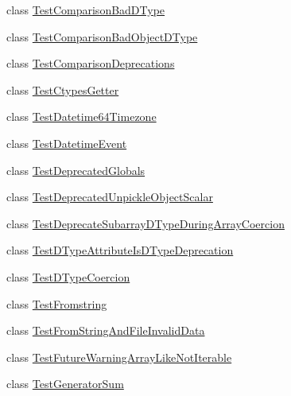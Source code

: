 \begin{DoxyCompactItemize}
class \hyperlink{classnumpy_1_1core_1_1tests_1_1test__deprecations_1_1TestComparisonBadDType}{Test\+Comparison\+Bad\+D\+Type}
\item 
class \hyperlink{classnumpy_1_1core_1_1tests_1_1test__deprecations_1_1TestComparisonBadObjectDType}{Test\+Comparison\+Bad\+Object\+D\+Type}
\item 
class \hyperlink{classnumpy_1_1core_1_1tests_1_1test__deprecations_1_1TestComparisonDeprecations}{Test\+Comparison\+Deprecations}
\item 
class \hyperlink{classnumpy_1_1core_1_1tests_1_1test__deprecations_1_1TestCtypesGetter}{Test\+Ctypes\+Getter}
\item 
class \hyperlink{classnumpy_1_1core_1_1tests_1_1test__deprecations_1_1TestDatetime64Timezone}{Test\+Datetime64\+Timezone}
\item 
class \hyperlink{classnumpy_1_1core_1_1tests_1_1test__deprecations_1_1TestDatetimeEvent}{Test\+Datetime\+Event}
\item 
class \hyperlink{classnumpy_1_1core_1_1tests_1_1test__deprecations_1_1TestDeprecatedGlobals}{Test\+Deprecated\+Globals}
\item 
class \hyperlink{classnumpy_1_1core_1_1tests_1_1test__deprecations_1_1TestDeprecatedUnpickleObjectScalar}{Test\+Deprecated\+Unpickle\+Object\+Scalar}
\item 
class \hyperlink{classnumpy_1_1core_1_1tests_1_1test__deprecations_1_1TestDeprecateSubarrayDTypeDuringArrayCoercion}{Test\+Deprecate\+Subarray\+D\+Type\+During\+Array\+Coercion}
\item 
class \hyperlink{classnumpy_1_1core_1_1tests_1_1test__deprecations_1_1TestDTypeAttributeIsDTypeDeprecation}{Test\+D\+Type\+Attribute\+Is\+D\+Type\+Deprecation}
\item 
class \hyperlink{classnumpy_1_1core_1_1tests_1_1test__deprecations_1_1TestDTypeCoercion}{Test\+D\+Type\+Coercion}
\item 
class \hyperlink{classnumpy_1_1core_1_1tests_1_1test__deprecations_1_1TestFromstring}{Test\+Fromstring}
\item 
class \hyperlink{classnumpy_1_1core_1_1tests_1_1test__deprecations_1_1TestFromStringAndFileInvalidData}{Test\+From\+String\+And\+File\+Invalid\+Data}
\item 
class \hyperlink{classnumpy_1_1core_1_1tests_1_1test__deprecations_1_1TestFutureWarningArrayLikeNotIterable}{Test\+Future\+Warning\+Array\+Like\+Not\+Iterable}
\item 
class \hyperlink{classnumpy_1_1core_1_1tests_1_1test__deprecations_1_1TestGeneratorSum}{Test\+Generator\+Sum}

\end{DoxyCompactItemize}
